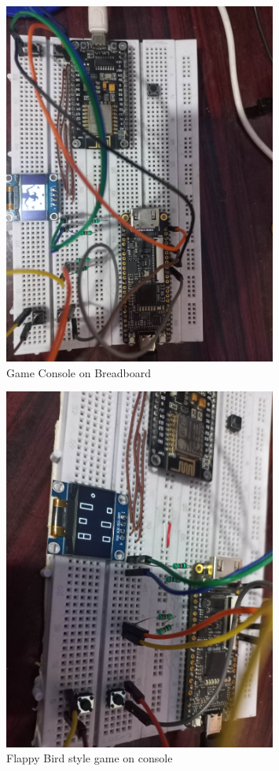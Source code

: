 \documentclass[a4paper,12pt]{article}
\begin{document}
    \begin{figure}[H]
    \centering
    \includegraphics[width=0.8\textwidth]{images/fpga_bhoos.jpg} 
    \caption{Game Console on Breadboard}
    \end{figure}

    \begin{figure}[H]
    \centering
    \includegraphics[width=0.8\textwidth]{images/fpga_flappy.jpg} 
    \caption{Flappy Bird style game on console}
    \end{figure}
\end{document}
